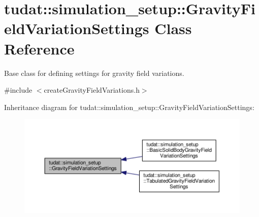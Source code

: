 \hypertarget{classtudat_1_1simulation__setup_1_1GravityFieldVariationSettings}{}\section{tudat\+:\+:simulation\+\_\+setup\+:\+:Gravity\+Field\+Variation\+Settings Class Reference}
\label{classtudat_1_1simulation__setup_1_1GravityFieldVariationSettings}


Base class for defining settings for gravity field variations.  




{\ttfamily \#include $<$create\+Gravity\+Field\+Variations.\+h$>$}



Inheritance diagram for tudat\+:\+:simulation\+\_\+setup\+:\+:Gravity\+Field\+Variation\+Settings\+:
\nopagebreak
\begin{figure}[H]
\begin{center}
\leavevmode
\includegraphics[width=350pt]{classtudat_1_1simulation__setup_1_1GravityFieldVariationSettings__inherit__graph}
\end{center}
\end{figure}
